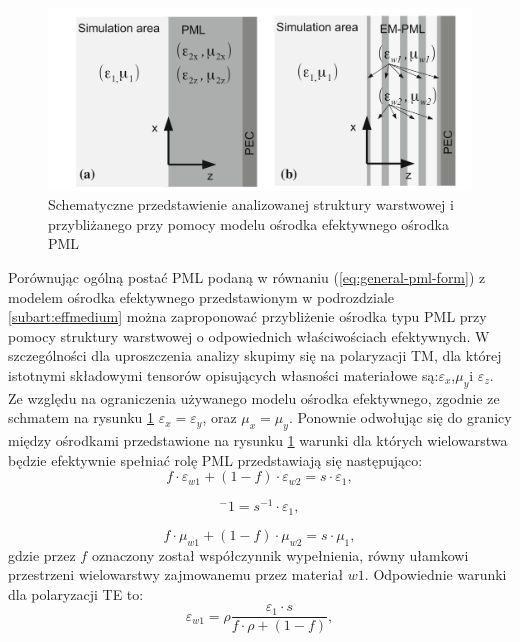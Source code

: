 \begin{figure}[tb]
	\includegraphics[width=\textwidth]{images/pml/oqe_schemat.png}
	\caption{Schematyczne przedstawienie analizowanej struktury warstwowej i przybliżanego przy pomocy modelu ośrodka efektywnego ośrodka PML}
	\label{fig:pml-multilay-schem}
\end{figure}

Porównując ogólną postać PML podaną w równaniu (\ref{eq:general-pml-form}) z modelem ośrodka efektywnego przedstawionym w podrozdziale \ref{subart:effmedium} można zaproponować przybliżenie ośrodka typu PML przy pomocy struktury warstwowej o odpowiednich właściwościach efektywnych. W szczególności dla uproszczenia analizy skupimy się na polaryzacji TM, dla której istotnymi składowymi tensorów opisujących własności materiałowe są:$\varepsilon_x$,$\mu_y$i $\varepsilon_z$. Ze względu na ograniczenia używanego modelu ośrodka efektywnego, zgodnie ze schmatem na rysunku \ref{fig:pml-multilay-schem} $\varepsilon_x=\varepsilon_y$, oraz $\mu_x=\mu_y$. Ponownie odwołując się do granicy między ośrodkami przedstawione na rysunku \ref{fig:pml-multilay-schem} warunki dla których wielowarstwa będzie efektywnie spełniać rolę PML przedstawiają się następująco:
\begin{equation}
	f\cdot \varepsilon_{w1} + (1-f)\cdot \varepsilon_{w2} = s \cdot \varepsilon_1,
	\label{eq:oqe4}
\end{equation}

\begin{equation}
	[f\cdot \varepsilon_{w1}^{-1}+(1-f)\varepsilon_{w2}^{-1}]^-1=s^{-1}\cdot \varepsilon_1,
	\label{eq:oqe5}
\end{equation}

\begin{equation}
	f\cdot \mu_{w1} + (1-f)\cdot \mu_{w2} = s \cdot \mu_1,
	\label{eq:oqe6}
\end{equation}
gdzie przez $f$ oznaczony został współczynnik wypełnienia, równy ułamkowi przestrzeni wielowarstwy zajmowanemu przez materiał $w1$. Odpowiednie warunki dla polaryzacji TE to:
\begin{equation}
	\varepsilon_{w1}=\rho \frac{\varepsilon_1 \cdot s}{f\cdot \rho + (1 -f) },
	\label{eq:te-eps1}
\end{equation}

